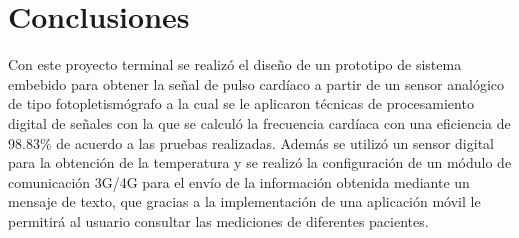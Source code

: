 \documentclass[journal]{IEEEtran}
\begin{document}


\section{Conclusiones}
Con este proyecto terminal se realizó el diseño de un prototipo de sistema embebido para obtener la señal de pulso cardíaco  a partir de un sensor analógico de tipo fotopletismógrafo a la cual se le aplicaron técnicas de procesamiento digital de señales con la que se calculó la frecuencia cardíaca con una eficiencia de 98.83\% de acuerdo a las pruebas realizadas. Además se utilizó un sensor digital para la obtención de la temperatura y se realizó la configuración de un módulo de comunicación 3G/4G para el envío de la información obtenida mediante un mensaje de texto, que gracias a la implementación de una aplicación móvil le permitirá al usuario consultar las mediciones de diferentes pacientes.



%
\end{document}
